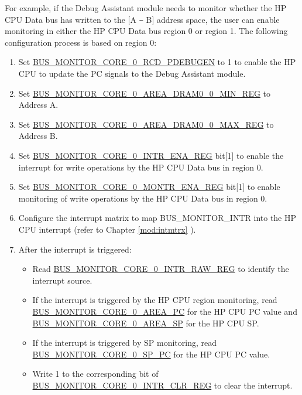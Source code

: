\documentclass[main\_\_EN.tex]{subfiles}
\begin{document}
For example, if the Debug Assistant module needs to monitor whether the HP CPU Data bus has written to the [A \verb+~+ B] address space, the user can enable monitoring in either the HP CPU Data bus region 0 or region 1. The following configuration process is based on region 0:

\begin{enumerate}
    \item Set \hyperref[fielddesc:BUSMONITORCORE0RCDPDEBUGEN]{BUS\_MONITOR\_CORE\_0\_RCD\_PDEBUGEN} to 1 to enable the HP CPU to update the PC signals to the Debug Assistant module.
    \item Set \hyperref[regdesc:BUSMONITORCORE0AREADRAM00MINREG]{BUS\_MONITOR\_CORE\_0\_AREA\_DRAM0\_0\_MIN\_REG} to Address A.
    \item Set \hyperref[regdesc:BUSMONITORCORE0AREADRAM00MAXREG]{BUS\_MONITOR\_CORE\_0\_AREA\_DRAM0\_0\_MAX\_REG} to Address B.
    \item Set \hyperref[regdesc:BUSMONITORCORE0INTRENAREG]{BUS\_MONITOR\_CORE\_0\_INTR\_ENA\_REG} bit[1] to enable the interrupt for write operations by the HP CPU Data bus in region 0.
    \item Set \hyperref[regdesc:BUSMONITORCORE0MONTRENAREG]{BUS\_MONITOR\_CORE\_0\_MONTR\_ENA\_REG} bit[1] to enable monitoring of write operations by the HP CPU Data bus in region 0.
    \item Configure the interrupt matrix to map BUS\_MONITOR\_INTR into the HP CPU interrupt (refer to Chapter \ref{mod:intmtrx} \textit{}).
    \item After the interrupt is triggered:
        \begin{itemize}
            \item Read \hyperref[regdesc:BUSMONITORCORE0INTRRAWREG]{BUS\_MONITOR\_CORE\_0\_INTR\_RAW\_REG} to identify the interrupt source.
            \item If the interrupt is triggered by the HP CPU region monitoring, read \hyperref[fielddesc:BUSMONITORCORE0AREAPC]{BUS\_MONITOR\_CORE\_0\_AREA\_PC} for the HP CPU PC value and \hyperref[fielddesc:BUSMONITORCORE0AREASP]{BUS\_MONITOR\_CORE\_0\_AREA\_SP} for the HP CPU SP.
            \item If the interrupt is triggered by SP monitoring, read \hyperref[fielddesc:BUSMONITORCORE0SPPC]{BUS\_MONITOR\_CORE\_0\_SP\_PC} for the HP CPU PC value.
            \item Write 1 to the corresponding bit of \hyperref[regdesc:BUSMONITORCORE0INTRCLRREG]{BUS\_MONITOR\_CORE\_0\_INTR\_CLR\_REG} to clear the interrupt.
        \end{itemize}
\end{enumerate}
\end{document}
